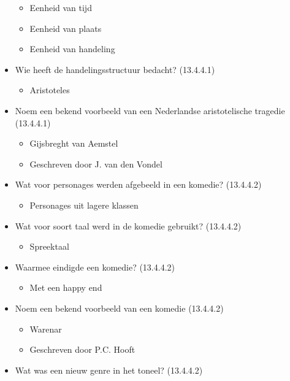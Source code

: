\begin{itemize}
  \begin{itemize}
  \itemsep1pt\parskip0pt
  \item
    Eenheid van tijd
  \item
    Eenheid van plaats
  \item
    Eenheid van handeling
  \end{itemize}
\item
  Wie heeft de handelingsstructuur bedacht? (13.4.4.1)

  \begin{itemize}
  \itemsep1pt\parskip0pt
  \item
    Aristoteles
  \end{itemize}
\item
  Noem een bekend voorbeeld van een Nederlandse aristotelische tragedie
  (13.4.4.1)

  \begin{itemize}
  \itemsep1pt\parskip0pt
  \item
    Gijsbreght van Aemstel
  \item
    Geschreven door J. van den Vondel
  \end{itemize}
\item
  Wat voor personages werden afgebeeld in een komedie? (13.4.4.2)

  \begin{itemize}
  \itemsep1pt\parskip0pt
  \item
    Personages uit lagere klassen
  \end{itemize}
\item
  Wat voor soort taal werd in de komedie gebruikt? (13.4.4.2)

  \begin{itemize}
  \itemsep1pt\parskip0pt
  \item
    Spreektaal
  \end{itemize}
\item
  Waarmee eindigde een komedie? (13.4.4.2)

  \begin{itemize}
  \itemsep1pt\parskip0pt
  \item
    Met een happy end
  \end{itemize}
\item
  Noem een bekend voorbeeld van een komedie (13.4.4.2)

  \begin{itemize}
  \itemsep1pt\parskip0pt
  \item
    Warenar
  \item
    Geschreven door P.C. Hooft
  \end{itemize}
\item
  Wat was een nieuw genre in het toneel? (13.4.4.2)


\end{itemize}
